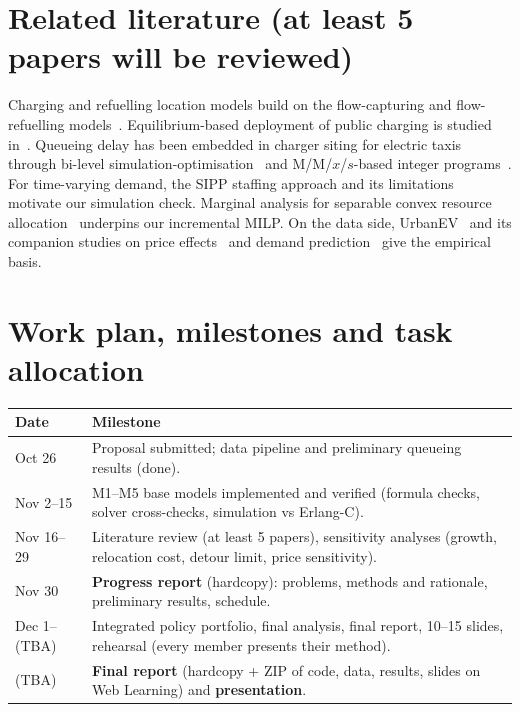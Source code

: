 \documentclass[11pt,a4paper]{article}
\begin{document}
\section{Related literature (at least 5 papers will be reviewed)}
Charging and refuelling location models build on the flow-capturing and flow-refuelling models~\cite{hodgson1990,kuby2005}. Equilibrium-based deployment of public charging is studied in~\cite{he2013}. Queueing delay has been embedded in charger siting for electric taxis through bi-level simulation-optimisation~\cite{jung2014} and M/M/$x$/$s$-based integer programs~\cite{yang2017}. For time-varying demand, the SIPP staffing approach and its limitations~\cite{green2001} motivate our simulation check. Marginal analysis for separable convex resource allocation~\cite{fox1966} underpins our incremental MILP. On the data side, UrbanEV~\cite{li2025urbanev} and its companion studies on price effects~\cite{kuang2024} and demand prediction~\cite{qu2024} give the empirical basis.

\section{Work plan, milestones and task allocation}
\begin{tabular}{@{}p{3.3cm}p{12.4cm}@{}}\toprule
\textbf{Date} & \textbf{Milestone}\\\midrule
Oct 26 & Proposal submitted; data pipeline and preliminary queueing results (done).\\
Nov 2--15 & M1--M5 base models implemented and verified (formula checks, solver cross-checks, simulation vs Erlang-C).\\
Nov 16--29 & Literature review (at least 5 papers), sensitivity analyses (growth, relocation cost, detour limit, price sensitivity).\\
Nov 30 & \textbf{Progress report} (hardcopy): problems, methods and rationale, preliminary results, schedule.\\
Dec 1--(TBA) & Integrated policy portfolio, final analysis, final report, 10--15 slides, rehearsal (every member presents their method).\\
(TBA) & \textbf{Final report} (hardcopy + ZIP of code, data, results, slides on Web Learning) and \textbf{presentation}.\\\bottomrule
\end{tabular}
\end{document}
